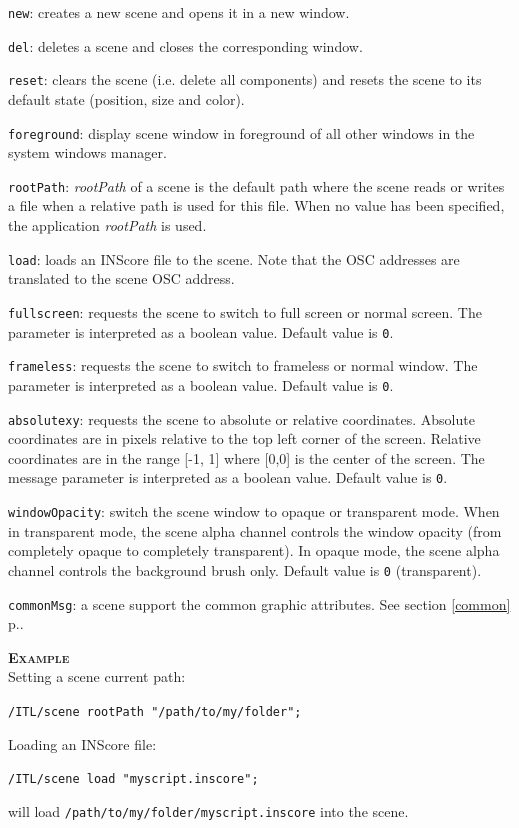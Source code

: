 \documentclass[a4paper,twoside]{report}
\newcommand{\fullref}[1]	{\ref{#1} p.\pageref{#1}}
\newcommand{\OSC}[1]		{\texttt{#1}}
\newcommand{\values}[1]		{\texttt{#1}}
\newcommand{\example}		{\textbf{\hspace{-1.5cm}\textbf{\textsc{Example }}}}
\let\olditemize\itemize
\let\oldenditemize\enditemize
\renewenvironment{itemize} 	{\olditemize \setlength{\itemsep}{1mm}}{\oldenditemize}
\newcommand{\sample}	[1]			{\vspace{-2mm}\begin{center}\colorbox{mygrey}{
								\begin{minipage}[t]{0.9\columnwidth} 
								{\small \texttt{#1}}
								\end{minipage}}\end{center}}
\newcommand{\sampleindent}	{ \hspace{0.5cm} }
\begin{document}
\begin{itemize}
\item \OSC{new}: creates a new scene and opens it in a new window.
\item \OSC{del}: deletes a scene and closes the corresponding window.
\item \OSC{reset}: clears the scene (i.e. delete all components) and resets the scene to its default state (position, size and color).
\item \OSC{foreground}: display scene window in foreground of all other windows in the system windows manager.
\item \OSC{rootPath}: \emph{rootPath} of a scene is the default path where the scene reads or writes a file when a relative path is used for this file. When no value has been specified, the application  \emph{rootPath} is used.
\item \OSC{load}: loads an INScore file to the scene. Note that the OSC addresses are translated to the scene OSC address.
\item \OSC{fullscreen}: requests the scene to switch to full screen or normal screen.  The parameter is interpreted as a boolean value. Default value is \values{0}.
\item \OSC{frameless}: requests the scene to switch to frameless or normal window.  The parameter is interpreted as a boolean value. Default value is \values{0}.
\item \OSC{absolutexy}: requests the scene to absolute or relative coordinates. Absolute coordinates are in pixels relative to the top left corner of the screen. Relative coordinates are in the range [-1, 1] where [0,0] is the center of the screen. The message parameter is interpreted as a boolean value. Default value is \values{0}.
\item \OSC{windowOpacity}: switch the scene window to opaque or transparent mode. When in transparent mode, the scene alpha channel controls the window opacity (from completely opaque to completely transparent). In opaque mode, the scene alpha channel controls the background brush only. Default value is \values{0} (transparent).
\item \OSC{commonMsg}: a scene support the common graphic attributes. See section \fullref{common}.
\end{itemize}

\example \\
Setting a scene current path:
\sample{/ITL/scene rootPath "/path/to/my/folder";}
Loading an INScore file:
\sample{/ITL/scene load "myscript.inscore";}
\sampleindent will load \OSC{/path/to/my/folder/myscript.inscore} into the scene. 
\end{document}

